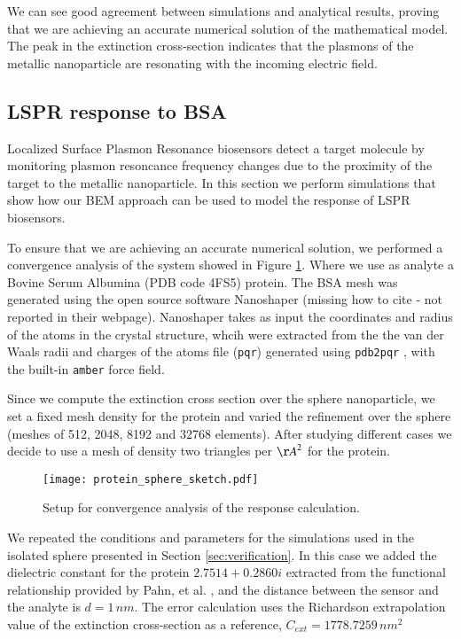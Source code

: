 We can see good agreement between simulations and analytical results, proving
that we are achieving an accurate numerical solution of the mathematical model. The 
peak in the extinction cross-section indicates that the plasmons of the metallic
nanoparticle are resonating with the incoming electric field.


\subsection{LSPR response to BSA} \label{sec:lspr_response}

Localized Surface Plasmon Resonance biosensors detect a target molecule by monitoring
plasmon resoncance frequency changes due to the proximity of the target to the metallic
nanoparticle. In this section we perform simulations that show how our BEM approach
can be used to model the response of LSPR biosensors.

To ensure that we are achieving an accurate numerical solution, we performed a 
convergence analysis of the system showed in Figure \ref{fig:setup_conv}. Where
we use as analyte a Bovine Serum Albumina (PDB code 4FS5) protein. The BSA mesh
was generated using the open source software Nanoshaper (missing how to cite - not
reported in their webpage). Nanoshaper takes as input the coordinates and radius
of the atoms in the crystal structure, whcih were extracted from the the van der
Waals radii and charges of the atoms file (\texttt{pqr}) generated using 
\texttt{pdb2pqr} \cite{Dolinsky04}, with the built-in \texttt{amber} force field.

Since we compute the extinction cross section over the sphere nanoparticle, we 
set a fixed mesh density for the protein and varied the refinement over the
sphere (meshes of 512, 2048, 8192 and 32768 elements). After studying different 
cases we decide to use a mesh of density two triangles per ${\AA}^2$ for 
the protein. 



\begin{figure}[h] %
   \centering
   \texttt{[image: protein\_sphere\_sketch.pdf]} 
   \caption{Setup for convergence analysis of the response calculation.}
   \label{fig:setup_conv}
\end{figure}

We repeated the conditions and parameters for the simulations used in the isolated
sphere presented in Section \ref{sec:verification}. In this case we added the 
dielectric constant for the protein $2.7514 + 0.2860i$ extracted from the 
functional relationship provided by Pahn, et al. \cite{PahnETal2013}, and the 
distance between the sensor and the analyte is $d=1 \, nm$. The error calculation
uses the Richardson extrapolation value of the extinction cross-section as a
reference, $C_{ext}= 1778.7259 \, nm^2$



